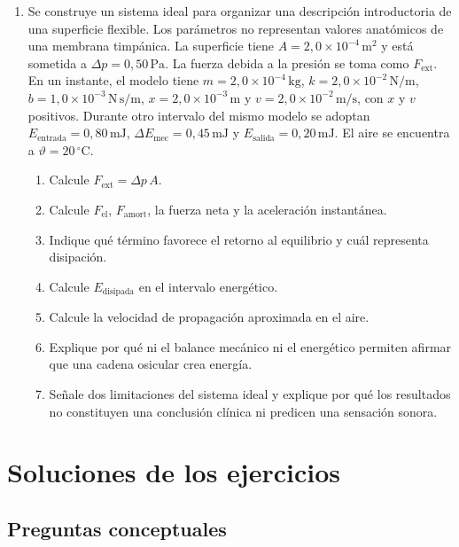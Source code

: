 \begin{enumerate}[label=\textbf{I\arabic*.},leftmargin=*]
    \item Se construye un sistema ideal para organizar una descripción
    introductoria de una superficie flexible. Los parámetros no representan
    valores anatómicos de una membrana timpánica. La superficie tiene
    \(A=2{,}0\times10^{-4}\,\text{m}^{2}\) y está sometida a
    \(\Delta p=0{,}50\,\text{Pa}\). La fuerza debida a la presión se toma como
    \(F_\mathrm{ext}\). En un instante, el modelo tiene
    \(m=2{,}0\times10^{-4}\,\text{kg}\),
    \(k=2{,}0\times10^{-2}\,\text{N}/\text{m}\),
    \(b=1{,}0\times10^{-3}\,\text{N}\,\text{s}/\text{m}\),
    \(x=2{,}0\times10^{-3}\,\text{m}\) y
    \(v=2{,}0\times10^{-2}\,\text{m}/\text{s}\), con \(x\) y \(v\) positivos.
    Durante otro intervalo del mismo modelo se adoptan
    \(E_\mathrm{entrada}=0{,}80\,\text{mJ}\),
    \(\Delta E_\mathrm{mec}=0{,}45\,\text{mJ}\) y
    \(E_\mathrm{salida}=0{,}20\,\text{mJ}\). El aire se encuentra a
    \(\vartheta=20\,^{\circ}\text{C}\).
    \begin{enumerate}[label=\alph*)]
        \item Calcule \(F_\mathrm{ext}=\Delta p\,A\).
        \item Calcule \(F_\mathrm{el}\), \(F_\mathrm{amort}\), la fuerza neta y
        la aceleración instantánea.
        \item Indique qué término favorece el retorno al equilibrio y cuál
        representa disipación.
        \item Calcule \(E_\mathrm{disipada}\) en el intervalo energético.
        \item Calcule la velocidad de propagación aproximada en el aire.
        \item Explique por qué ni el balance mecánico ni el energético permiten
        afirmar que una cadena osicular crea energía.
        \item Señale dos limitaciones del sistema ideal y explique por qué los
        resultados no constituyen una conclusión clínica ni predicen una
        sensación sonora.
    \end{enumerate}
\end{enumerate}

\section{Soluciones de los ejercicios}
\label{sec:u2-soluciones}

\subsection*{Preguntas conceptuales}

